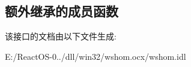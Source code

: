 \subsection*{额外继承的成员函数}


该接口的文档由以下文件生成\+:\begin{DoxyCompactItemize}
\item 
E\+:/\+React\+O\+S-\/0../dll/win32/wshom.\+ocx/wshom.\+idl\end{DoxyCompactItemize}
